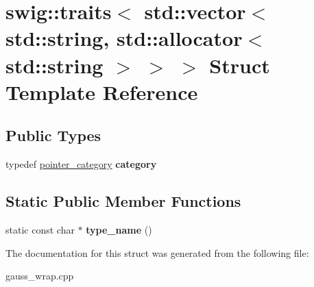 \hypertarget{structswig_1_1traits_3_01std_1_1vector_3_01std_1_1string_00_01std_1_1allocator_3_01std_1_1string_01_4_01_4_01_4}{\section{swig\-:\-:traits$<$ std\-:\-:vector$<$ std\-:\-:string, std\-:\-:allocator$<$ std\-:\-:string $>$ $>$ $>$ Struct Template Reference}
\label{structswig_1_1traits_3_01std_1_1vector_3_01std_1_1string_00_01std_1_1allocator_3_01std_1_1string_01_4_01_4_01_4}
}
\subsection*{Public Types}
\begin{DoxyCompactItemize}
\item 
\hypertarget{structswig_1_1traits_3_01std_1_1vector_3_01std_1_1string_00_01std_1_1allocator_3_01std_1_1string_01_4_01_4_01_4_a888c5f49b4d76c1791d18b280dc89af6}{typedef \hyperlink{structswig_1_1pointer__category}{pointer\-\_\-category} {\bfseries category}}\label{structswig_1_1traits_3_01std_1_1vector_3_01std_1_1string_00_01std_1_1allocator_3_01std_1_1string_01_4_01_4_01_4_a888c5f49b4d76c1791d18b280dc89af6}

\end{DoxyCompactItemize}
\subsection*{Static Public Member Functions}
\begin{DoxyCompactItemize}
\item 
\hypertarget{structswig_1_1traits_3_01std_1_1vector_3_01std_1_1string_00_01std_1_1allocator_3_01std_1_1string_01_4_01_4_01_4_a9196f04cf4a0e459d368b9f457bb96f0}{static const char $\ast$ {\bfseries type\-\_\-name} ()}\label{structswig_1_1traits_3_01std_1_1vector_3_01std_1_1string_00_01std_1_1allocator_3_01std_1_1string_01_4_01_4_01_4_a9196f04cf4a0e459d368b9f457bb96f0}

\end{DoxyCompactItemize}


The documentation for this struct was generated from the following file\-:\begin{DoxyCompactItemize}
\item 
gauss\-\_\-wrap.\-cpp\end{DoxyCompactItemize}
